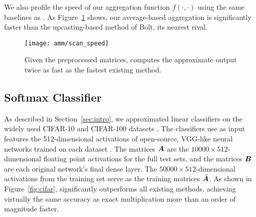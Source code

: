 \vspace{-1.5mm}
We also profile the speed of our aggregation function $f(\cdot, \cdot)$ using the same baselines as \citet{bolt}. As Figure~\ref{fig:scanSpeed} shows, our average-based aggregation is significantly faster than the upcasting-based method of Bolt, its nearest rival.
\vspace{2mm}

\begin{figure}[h]
\begin{center}
\texttt{[image: amm/scan\_speed]}
\caption{Given the preprocessed matrices, \oursp computes the approximate output twice as fast as the fastest existing method.}
\label{fig:scanSpeed}
\end{center}
\end{figure}

\subsection{Softmax Classifier}
\vspace{-.5mm}

As described in Section~\ref{sec:intro}, we approximated linear classifiers on the widely used CIFAR-10 and CIFAR-100 datasets \cite{cifarDsets}. The classifiers use as input features the 512-dimensional activations of open-source, VGG-like neural networks trained on each dataset \cite{cifarVgg}. The matrices $\bm{A}$ are the $10000 \times 512$-dimensional floating point activations for the full test sets, and the matrices $\bm{B}$ are each original network's final dense layer. The $50000 \times 512$-dimensional activations from the training set serve as the training matrices $\tilde{\bm{A}}$.
As shown in Figure~\ref{fig:cifar}, \oursp significantly outperforms all existing methods, achieving virtually the same accuracy as exact multiplication more than an order of magnitude faster.


